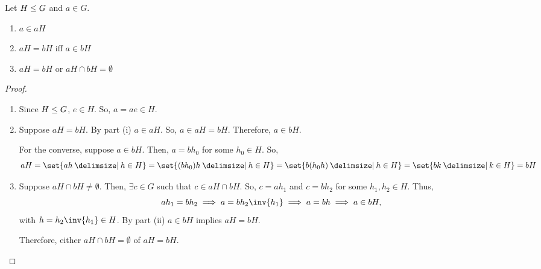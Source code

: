 \documentclass[11pt]{penrose}
\begin{document}
\begin{nthm}\label{thm:coset-properties-a}
    Let $H \mathrel{\leq} G$ and $a \in G$.
    \begin{enumerate}[label=(\roman*)]
        \item $a \in aH$
        \item $aH = bH$ iff $a \in bH$
        \item $aH = bH$ or $aH \cap bH = \emptyset$
    \end{enumerate}
\end{nthm}
\begin{proof}
    \begin{enumerate}[label=(\roman*)]
        \item Since $H \mathrel{\leq} G$, $e \in H$. So, $a = ae \in H$.

        \item Suppose $aH = bH$. By part (i) $a \in aH$. So, $a \in aH = bH$. Therefore, $a \in bH$.

        For the converse, suppose $a \in bH$. Then, $a = bh_0$ for some $h_0 \in H$. So,
        \begin{equation*}
            aH
            = \set{ah \st h \in H}
            = \set{(bh_0)h \st h \in H}
            = \set{b(h_0 h) \st h \in H}
            = \set{bk \st k \in H}
            = bH
        \end{equation*}

        \item Suppose $aH \cap bH \neq \emptyset$. Then, $\exists c \in G$ such that $c \in aH \cap bH$. So, $c = ah_1$ and $c = bh_2$ for some $h_1, h_2 \in H$. Thus,
        \begin{equation*}
            ah_1 = bh_2
            \implies a = bh_2 \inv{h_1}
            \implies a = bh
            \implies a \in bH,
        \end{equation*}
        with $h = h_2 \inv{h_1} \in H$. By part (ii) $a \in bH$ implies $aH = bH$.

        Therefore, either $aH \cap bH = \emptyset$ of $aH = bH$.\qedhere
    \end{enumerate}
\end{proof}
\end{document}
